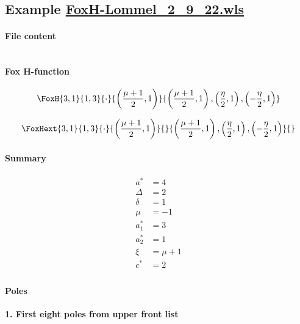 \documentclass[preview]{standalone}
\begin{document}
\subsection{Example \url{FoxH-Lommel_2_9_22.wls}}

\paragraph{File content}

\inputminted{text}{../Examples/FoxH-Lommel_2_9_22.wls}

\paragraph{Fox H-function}

\begin{align*}
  \FoxH
    {3,1}
    {1,3}
    {\cdot}
    {\left(\frac{\mu +1}{2}, 1\right)}
    {\left(\frac{\mu +1}{2}, 1\right), \left(\frac{\eta }{2}, 1\right), \left(-\frac{\eta }{2}, 1\right)}
\end{align*}

\begin{align*}
  \FoxHext
    {3,1}
    {1,3}
    {\cdot}
    {\left(\frac{\mu +1}{2}, 1\right)}
    {}
    {\left(\frac{\mu +1}{2}, 1\right), \left(\frac{\eta }{2}, 1\right), \left(-\frac{\eta }{2}, 1\right)}
    {}
\end{align*}

\paragraph{Summary}

\begin{align*}
  a^*    & = 4 \\
  \Delta & = 2 \\
  \delta & = 1 \\
  \mu    & = -1 \\
  a_1^*  & = 3 \\
  a_2^*  & = 1 \\
  \xi    & = \mu +1 \\
  c^*    & = 2 \\
\end{align*}

\paragraph{Poles}

\noindent\textbf{1. First eight poles from upper front list}
\end{document}
